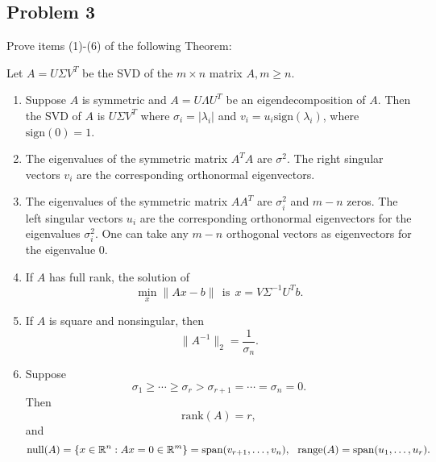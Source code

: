 \documentclass[12pt]{report}
\begin{document}


\begin{problem}%
\subsection*{Problem 3}

Prove items (1)-(6) of the following Theorem:

Let $A = U\Sigma V^T$ be the SVD of the $m \times n$ matrix $A, m \geq n$.
\begin{enumerate}
    \item Suppose $A$ is symmetric and $A = U \Lambda U^T$ be an eigendecomposition of $A$. Then the SVD of $A$ is $U\Sigma V^T$ where $\sigma_i = |\lambda_i|$ and $v_i = u_i \text{sign}(\lambda_i)$, where $\text{sign}(0) = 1$.
    \item The eigenvalues of the symmetric matrix $A^TA$ are $\sigma^2$. The right singular vectors $v_i$ are the corresponding orthonormal eigenvectors.
    \item The eigenvalues of the symmetric matrix $AA^T$ are $\sigma_i^2$ and $m-n$ zeros. The left singular vectors $u_i$ are the corresponding orthonormal eigenvectors for the eigenvalues $\sigma_i^2$. One can take any $m - n$ orthogonal vectors as eigenvectors for the eigenvalue $0$.
    \item If $A$ has full rank, the solution of
    \[
         \min_{x}\|Ax-b\| ~~ \text{is}~~ x = V\Sigma^{-1}U^Tb.
    \]
    \item If $A$ is square and nonsingular, then
    \[
         \|A^{-1}\|_2 = \frac{1}{\sigma_n}.
    \]
    \item Suppose
    \[
        \sigma_1 \geq \cdots \geq \sigma_r > \sigma_{r+1} = \cdots = \sigma_n = 0.
    \]
    Then
    \[
         \text{rank}(A) = r,
    \]
    and
    \[
         \text{null}(A) = \{ x \in {\mathbb R}^n : Ax = 0 \in {\mathbb R}^m\} = \text{span}(v_{r+1},\dots,v_n), ~~ \text{range}(A) = \text{span}(u_1,\dots,u_r).
    \]
    

\end{enumerate}



\end{problem}
\end{document}
